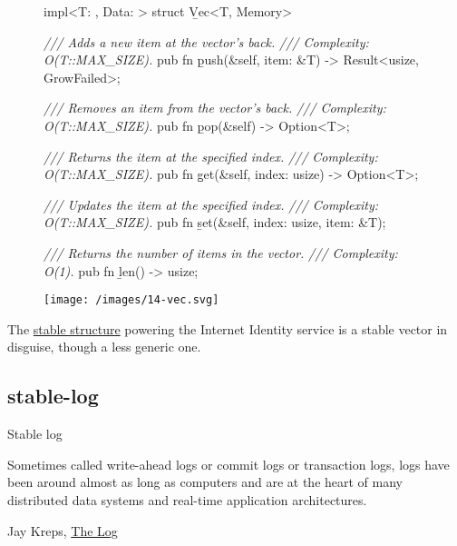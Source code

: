 \documentclass{article}
\begin{document}
\begin{figure}
\begin{code}[rust]
impl<T: \href{#storable-types}{}, Data: \href{#memory}{}> struct \b{Vec}<T, Memory> {
    \emph{/// Adds a new item at the vector's back.}
    \emph{/// Complexity: O(T::MAX_SIZE).}
    pub fn \b{push}(&self, item: &T) -> Result<usize, GrowFailed>;

    \emph{/// Removes an item from the vector's back.}
    \emph{/// Complexity: O(T::MAX_SIZE).}
    pub fn \b{pop}(&self) -> Option<T>;

    \emph{/// Returns the item at the specified index.}
    \emph{/// Complexity: O(T::MAX_SIZE).}
    pub fn \b{get}(&self, index: usize) -> Option<T>;

    \emph{/// Updates the item at the specified index.}
    \emph{/// Complexity: O(T::MAX_SIZE).}
    pub fn \b{set}(&self, index: usize, item: &T);

    \emph{/// Returns the number of items in the vector.}
    \emph{/// Complexity: O(1).}
    pub fn \b{len}() -> usize;
}
\end{code}
\end{figure}
\begin{figure}[grayscale-diagram]
  \texttt{[image: /images/14-vec.svg]}
\end{figure}

The \href{/posts/11-ii-stable-memory.html#ii-memory-layout}{stable structure} powering the Internet Identity service is a stable vector in disguise, though a less generic one.

\subsection{stable-log}{Stable log}
\epigraph{
  Sometimes called write-ahead logs or commit logs or transaction logs, logs have been around almost as long as computers and are at the heart of many distributed data systems and real-time application architectures.
}{Jay Kreps, \href{https://engineering.linkedin.com/distributed-systems/log-what-every-software-engineer-should-know-about-real-time-datas-unifying}{The Log}}
\end{document}

